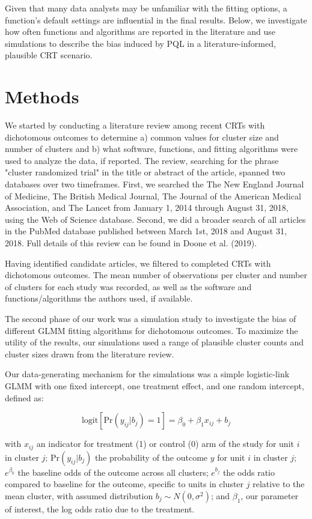 \documentclass[Afour,times,sagev,doublespace]{sagej}
\begin{document}
Given that many data analysts may be unfamiliar with the fitting options, a function's default settings are influential in the final results. Below, we investigate how often functions and algorithms are reported in the literature and use simulations to describe the bias induced by PQL in a literature-informed, plausible CRT scenario.


\section{Methods}


We started by conducting a literature review among recent CRTs with dichotomous outcomes to determine a) common values for cluster size and number of clusters and b) what software, functions, and fitting algorithms were used to analyze the data, if reported. The review, searching for the phrase "cluster randomized trial" in the title or abstract of the article, spanned two databases over two timeframes. First, we searched the The New England Journal of Medicine, The British Medical Journal, The Journal of the American Medical Association, and The Lancet from January 1, 2014 through August 31, 2018, using the Web of Science database. Second, we did a broader search of all articles in the PubMed database published between March 1st, 2018 and August 31, 2018. Full details of this review can be found in Doone et al. (2019).

Having identified candidate articles, we filtered to completed CRTs with dichotomous outcomes. The mean number of observations per cluster and number of clusters for each study was recorded, as well as the software and functions/algorithms the authors used, if available.

The second phase of our work was a simulation study to investigate the bias of different GLMM fitting algorithms for dichotomous outcomes. To maximize the utility of the results, our simulations used a range of plausible cluster counts and cluster sizes drawn from the literature review.

Our data-generating mechanism for the simulations was a simple logistic-link GLMM with one fixed intercept, one treatment effect, and one random intercept, defined as:

\begin{equation}
    \text{logit}[\text{Pr}(y_{ij}|b_j)=1]=\beta_0 + \beta_1 x_{ij} + b_j
\end{equation}

with $x_{ij}$ an indicator for treatment (1) or control (0) arm of the study for unit $i$ in cluster $j$; $\text{Pr}(y_{ij}|b_j)$ the probability of the outcome $y$ for unit $i$ in cluster $j$; $e^{\beta_0}$ the baseline odds of the outcome across all clusters; $e^{b_j}$ the odds ratio compared to baseline for the outcome, specific to units in cluster $j$ relative to the mean cluster, with assumed distribution $b_j \sim N(0, \sigma^2)$; and $\beta_1$, our parameter of interest, the log odds ratio due to the treatment. 
\end{document}
